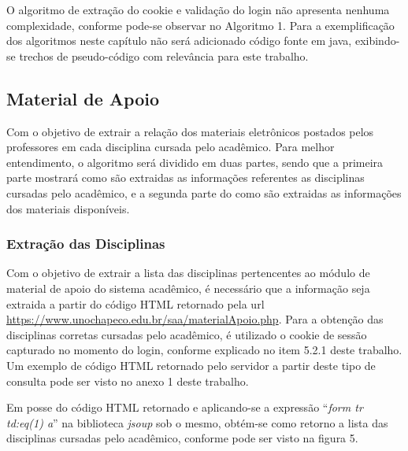 
  

O algoritmo de extração do cookie e validação do login não apresenta nenhuma complexidade, conforme pode-se observar no Algoritmo 1. Para a exemplificação dos algoritmos neste capítulo não será adicionado código fonte em java, exibindo-se trechos de pseudo-código com relevância para este trabalho.

\subsection{Material de Apoio}
Com o objetivo de extrair a relação dos materiais eletrônicos postados pelos professores em cada disciplina cursada pelo acadêmico. Para melhor entendimento, o algoritmo será dividido em duas partes, sendo que a primeira parte mostrará como são extraidas as informações referentes as disciplinas cursadas pelo acadêmico, e a segunda parte do como são extraidas as informações dos materiais disponíveis.


\subsubsection{Extração das Disciplinas}
Com o objetivo de extrair a lista das disciplinas pertencentes ao módulo de material de apoio do sistema acadêmico, é necessário que a informação seja extraida a partir do código HTML retornado pela url \url{https://www.unochapeco.edu.br/saa/materialApoio.php}. Para a obtenção das disciplinas corretas cursadas pelo acadêmico, é utilizado o cookie de sessão capturado no momento do login, conforme explicado no item 5.2.1 deste trabalho. Um exemplo de código HTML retornado pelo servidor a partir deste tipo de consulta pode ser visto no anexo 1 deste trabalho.

Em posse do código HTML retornado e aplicando-se a expressão ``\emph{form tr td:eq(1) a}'' na biblioteca \emph{jsoup} sob o mesmo, obtém-se como retorno a lista das disciplinas cursadas pelo acadêmico, conforme pode ser visto na figura 5.

